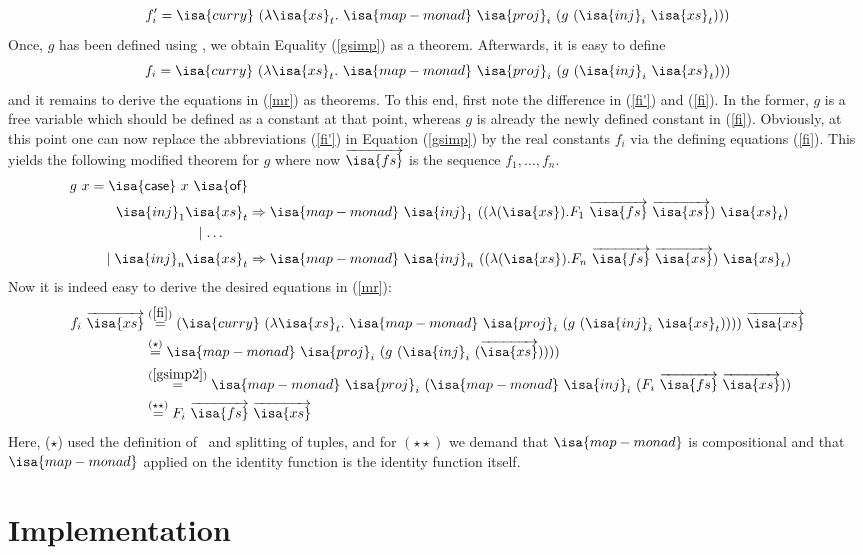 \documentclass[11pt,a4paper]{article}
\newcommand\isakwd[1]{\textsf{\isa{#1}}}
\newcommand\parfun{\isakwd{partial-function}}
\newcommand\vect[1]{\overrightarrow{#1}}
\newcommand\fs{\isa{fs}}
\newcommand\xs{\isa{xs}}
\newcommand\xst{\isa{xs}_t}
\newcommand\cprod[1]{({#1})}
\newcommand\tto\Rightarrow
\newcommand\inj{\isa{inj}}
\newcommand\proj{\isa{proj}}
\newcommand\mapM{\isa{map-monad}}
\newcommand\curry{\isa{curry}}
\newcommand\case{\isakwd{case}}
\newcommand\of{\isakwd{of}}
\begin{document}
\begin{equation}
\label{fi'}
f'_i = \curry\ (\lambda \xst. \ \mapM\ \proj_i\ (g\ (\inj_i\ \xst)))
\end{equation}
Once, $g$ has been defined using \parfun, we obtain Equality (\ref{gsimp}) as a theorem.
Afterwards, it is easy to define
\begin{equation}
\label{fi}
f_i = \curry\ (\lambda \xst.\ \mapM\ \proj_i\ (g\ (\inj_i\ \xst)))
\end{equation}
and it remains to derive the equations in (\ref{mr}) as theorems.
To this end, first note the difference in (\ref{fi'}) and (\ref{fi}). In the former, $g$ is a free
variable which should be defined as a constant at that point, 
whereas $g$ is already the newly defined constant in (\ref{fi}). Obviously, at this point one
can now replace the abbreviations (\ref{fi'}) in Equation (\ref{gsimp}) by the real constants $f_i$ via
the defining equations (\ref{fi}). This yields the following modified theorem for $g$ 
where now $\vect{\fs}$ is the sequence $f_1,\dots,f_n$.
\begin{align}
  g\ x = \case\ x\ \of \notag\\
    \inj_1 \xst & \tto \mapM\ \inj_1\ ((\lambda \cprod{\xs}. F_1\ \vect{\fs}\ \vect\xs)\ \xst) \notag\\
   \mid \ldots\hspace{1.8em} \label{gsimp2} \\
   \mid \inj_n \xst & \tto \mapM\ \inj_n\ ((\lambda \cprod{\xs}. F_n\ \vect{\fs}\ \vect\xs)\ \xst)\notag
\end{align}
Now it is indeed easy to derive the desired equations in (\ref{mr}):
\begin{align*}
f_i\ \vect\xs & \stackrel{(\ref{fi})}= (\curry\ (\lambda \xst.\ \mapM\ \proj_i\ (g\ (\inj_i\ \xst)))) \ \vect\xs \\
& \stackrel{(\star)}= \mapM\ \proj_i\ (g\ (\inj_i\ (\vect\xs)))) \\
& \stackrel{(\ref{gsimp2})}= \mapM\ \proj_i\ (\mapM\ \inj_i\ (F_i\ \vect{\fs}\ \vect\xs))\\
& \stackrel{(\star\star)}= F_i\ \vect{\fs}\ \vect\xs
\end{align*}
Here, ($\star$) used the definition of \curry\ and splitting of tuples, and for $(\star\star)$
we demand that $\mapM$ is compositional and that $\mapM$ applied on the identity function is the
identity function itself.


\section{Implementation}
\end{document}
